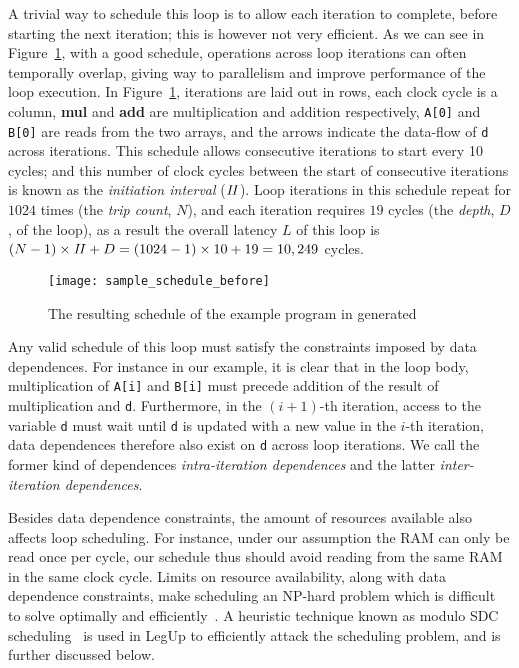 A trivial way to schedule this loop is to allow each iteration to complete,
before starting the next iteration; this is however not very efficient.
As we can see in Figure~\ref{bg:fig:sample_schedule_before}, with a good
schedule, operations across loop iterations can often temporally overlap,
giving way to parallelism and improve performance of the loop execution.  In
Figure~\ref{bg:fig:sample_schedule_before}, iterations are laid out in rows,
each clock cycle is a column, \textbf{mul} and \textbf{add} are multiplication
and addition respectively, \verb|A[0]| and \verb|B[0]| are reads from the two
arrays, and the arrows indicate the data-flow of \verb|d| across iterations.
This schedule allows consecutive iterations to start every 10 cycles; and this
number of clock cycles between the start of consecutive iterations is known
as the \emph{initiation interval} ($\mathit{II}$).  Loop iterations in this schedule
repeat for $1024$ times (the \emph{trip count}, $N$), and each iteration
requires $19$ cycles (the \emph{depth}, $D$, of the loop), as a result the
overall latency $L$ of this loop is $(N - 1) \times \mathit{II} + D = (1024 - 1) \times
10 + 19 = 10,249$ cycles.
\begin{figure}[ht]
    \centering
    \texttt{[image: sample\_schedule\_before]}
    \caption{The resulting schedule of the example program in generated}
    \label{bg:fig:sample_schedule_before}
\end{figure}

Any valid schedule of this loop must satisfy the constraints imposed by data
dependences.  For instance in our example, it is clear that in the loop body,
multiplication of \verb|A[i]| and \verb|B[i]| must precede addition of the
result of multiplication and \verb|d|.  Furthermore, in the $(i + 1)$-th
iteration, access to the variable \verb|d| must wait until \verb|d| is updated
with a new value in the $i$-th iteration, data dependences therefore also exist
on \verb|d| across loop iterations.  We call the former kind of dependences
\emph{intra-iteration dependences} and the latter \emph{inter-iteration
dependences}.

Besides data dependence constraints, the amount of resources available also
affects loop scheduling.  For instance, under our assumption the RAM can only
be read once per cycle, our schedule thus should avoid reading from the same
RAM in the same clock cycle.  Limits on resource availability, along with data
dependence constraints, make scheduling an NP-hard problem which is difficult
to solve optimally and efficiently~\cite{hwang91}.  A heuristic technique
known as modulo SDC scheduling~\cite{zhang13, canis14} is used in LegUp to
efficiently attack the scheduling problem, and is further discussed below.


